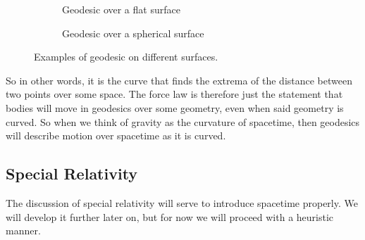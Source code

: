 \documentclass{article}
\begin{document}
 		\begin{figure}[h]
 			\begin{subfigure}{0.46\textwidth}
 				\center
 			\vspace{0.5cm}
 			\caption{Geodesic over a flat surface}
 			\end{subfigure}
 			\begin{subfigure}{0.46\textwidth}
 				\center
 				\caption{Geodesic over a spherical surface}
 			\end{subfigure}
 			\caption{Examples of geodesic on different surfaces.}
 		\end{figure}
 		So in other words, it is the curve that finds the extrema of the distance between two points over some space. The force law is therefore just the statement that bodies will move in geodesics over some geometry, even when said geometry is curved. So when we think of gravity as the curvature of spacetime, then geodesics will describe motion over spacetime as it is curved.
 		
 		\subsection{Special Relativity}
 		The discussion of special relativity will serve to introduce spacetime properly. We will develop it further later on, but for now we will proceed with a heuristic manner. 
 		
\end{document}
